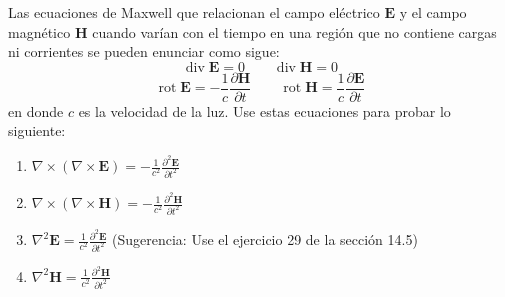 \item Las ecuaciones de Maxwell que relacionan el campo eléctrico $\mathbf{E}$ y el campo magnético $\mathbf{H}$ cuando varían con el tiempo en una región que no contiene cargas ni corrientes se pueden enunciar como sigue:
    \[ \operatorname{div} \mathbf{E} = 0 \qquad \operatorname{div} \mathbf{H} = 0 \]
    \[ \operatorname{rot} \mathbf{E} = -\frac{1}{c} \frac{\partial\mathbf{H}}{\partial t} \qquad \operatorname{rot} \mathbf{H} = \frac{1}{c} \frac{\partial\mathbf{E}}{\partial t} \]
    en donde $c$ es la velocidad de la luz. Use estas ecuaciones para probar lo siguiente:
    \begin{enumerate}
        \item[(a)] $\nabla \times (\nabla \times \mathbf{E}) = -\frac{1}{c^2} \frac{\partial^2\mathbf{E}}{\partial t^2}$
        \item[(b)] $\nabla \times (\nabla \times \mathbf{H}) = -\frac{1}{c^2} \frac{\partial^2\mathbf{H}}{\partial t^2}$
        \item[(c)] $\nabla^2\mathbf{E} = \frac{1}{c^2} \frac{\partial^2\mathbf{E}}{\partial t^2}$ \quad (Sugerencia: Use el ejercicio 29 de la sección 14.5)
        \item[(d)] $\nabla^2\mathbf{H} = \frac{1}{c^2} \frac{\partial^2\mathbf{H}}{\partial t^2}$
    \end{enumerate}
